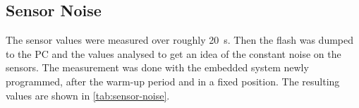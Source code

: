 \documentclass[final]{article}
\begin{document}
\subsection{Sensor Noise}
\label{ssec:sensor-noise}
The sensor values were measured over roughly \SI{20}{\second}.
Then the flash was dumped to the PC and the values analysed to get an idea of the constant noise on the sensors.
The measurement was done with the embedded system newly programmed, after the warm-up period and in a fixed position.
The resulting values are shown in \cref{tab:sensor-noise}.
\end{document}
